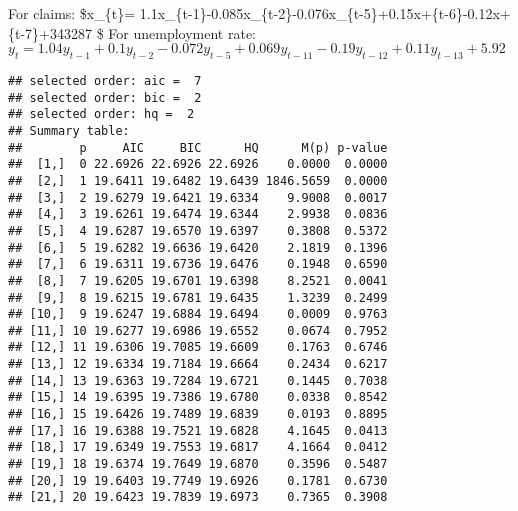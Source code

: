\documentclass[]{article}
\newenvironment{Shaded}{\begin{snugshade}}{\end{snugshade}}
\newcommand{\KeywordTok}[1]{\textcolor[rgb]{0.13,0.29,0.53}{\textbf{#1}}}
\newcommand{\DataTypeTok}[1]{\textcolor[rgb]{0.13,0.29,0.53}{#1}}
\newcommand{\DecValTok}[1]{\textcolor[rgb]{0.00,0.00,0.81}{#1}}
\newcommand{\OperatorTok}[1]{\textcolor[rgb]{0.81,0.36,0.00}{\textbf{#1}}}
\newcommand{\NormalTok}[1]{#1}
\begin{document}
For claims: \$x\_\{t\}=
1.1x\_\{t-1\}-0.085x\_\{t-2\}-0.076x\_\{t-5\}+0.15x+\{t-6\}-0.12x+\{t-7\}+343287
\$ For unemployment rate:
\(y_{t} = 1.04y_{t-1}+0.1y_{t-2}-0.072y_{t-5}+0.069y_{t-11}-0.19y_{t-12}+0.11y_{t-13} +5.92\)

\begin{Shaded}
\end{Shaded}

\begin{verbatim}
## selected order: aic =  7 
## selected order: bic =  2 
## selected order: hq =  2 
## Summary table:  
##        p     AIC     BIC      HQ      M(p) p-value
##  [1,]  0 22.6926 22.6926 22.6926    0.0000  0.0000
##  [2,]  1 19.6411 19.6482 19.6439 1846.5659  0.0000
##  [3,]  2 19.6279 19.6421 19.6334    9.9008  0.0017
##  [4,]  3 19.6261 19.6474 19.6344    2.9938  0.0836
##  [5,]  4 19.6287 19.6570 19.6397    0.3808  0.5372
##  [6,]  5 19.6282 19.6636 19.6420    2.1819  0.1396
##  [7,]  6 19.6311 19.6736 19.6476    0.1948  0.6590
##  [8,]  7 19.6205 19.6701 19.6398    8.2521  0.0041
##  [9,]  8 19.6215 19.6781 19.6435    1.3239  0.2499
## [10,]  9 19.6247 19.6884 19.6494    0.0009  0.9763
## [11,] 10 19.6277 19.6986 19.6552    0.0674  0.7952
## [12,] 11 19.6306 19.7085 19.6609    0.1763  0.6746
## [13,] 12 19.6334 19.7184 19.6664    0.2434  0.6217
## [14,] 13 19.6363 19.7284 19.6721    0.1445  0.7038
## [15,] 14 19.6395 19.7386 19.6780    0.0338  0.8542
## [16,] 15 19.6426 19.7489 19.6839    0.0193  0.8895
## [17,] 16 19.6388 19.7521 19.6828    4.1645  0.0413
## [18,] 17 19.6349 19.7553 19.6817    4.1664  0.0412
## [19,] 18 19.6374 19.7649 19.6870    0.3596  0.5487
## [20,] 19 19.6403 19.7749 19.6926    0.1781  0.6730
## [21,] 20 19.6423 19.7839 19.6973    0.7365  0.3908
\end{verbatim}

\begin{Shaded}
\end{Shaded}
\end{document}
